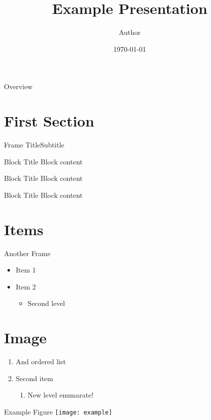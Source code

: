 \documentclass[aspectratio=1610]{beamer}
\title{Example Presentation}
\author{Author}
\date{\today}
\institute{KTH Mechanics}
\begin{document}
\startpage
\begin{frame}[noframenumbering]

  \maketitle

\end{frame}


\normalpage

\begin{frame}{Overview}
\tableofcontents
    
\end{frame}
\section{First Section}
\begin{frame}{Frame Title}{Subtitle}
\begin{block}{Block Title}
    Block content
\end{block}
\begin{alertblock}{Block Title}
    Block content
\end{alertblock}

\begin{example}{Block Title}
    Block content
\end{example}
\end{frame}

\section{Items}
\begin{frame}{Another Frame}
\begin{itemize}
    \item Item 1
    \item Item 2
    \begin{itemize}
        \item Second level
    \end{itemize}
\end{itemize}

\section{Image}
\begin{enumerate}
    \item And ordered list
    \item Second item
    \begin{enumerate}
        \item New level enumarate!
    \end{enumerate}
\end{enumerate}
\end{frame}

\begin{frame}{Example Figure}
\texttt{[image: example]}
\end{frame}
\end{document}

